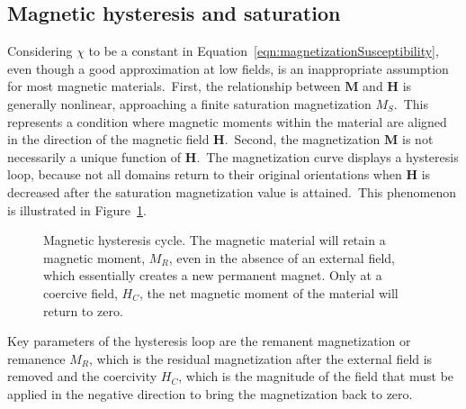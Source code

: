 \subsection{Magnetic hysteresis and saturation}\label{subsec:hysteresisAndSaturation}
Considering $\chi$ to be a constant in Equation~\ref{eqn:magnetizationSusceptibility}, even though a good approximation at low fields, is an inappropriate assumption for most magnetic materials.\ First, the relationship between $\mathbf{M}$ and $\mathbf{H}$ is generally nonlinear, approaching a finite saturation magnetization $M_{S}$.\ This represents a condition where magnetic moments within the material are aligned in the direction of the magnetic field $\mathbf{H}$.\ Second, the magnetization $\mathbf{M}$ is not necessarily a unique function of $\mathbf{H}$.\ The magnetization curve displays a hysteresis loop, because not all domains return to their original orientations when $\mathbf{H}$ is decreased after the saturation magnetization value is attained.\ This phenomenon is illustrated in Figure~\ref{fig:magneticHysteresis}.\
\begin{figure}[htb]
\centering
\caption[Magnetic hysteresis cycle]{Magnetic hysteresis cycle. The magnetic material will retain a magnetic moment, $M_{R}$, even in the absence of an external field, which essentially creates a new permanent magnet. Only at a coercive field, $H_{C}$, the net magnetic moment of the material will return to zero.}%
\label{fig:magneticHysteresis}
\end{figure}
Key parameters of the hysteresis loop are the remanent magnetization or remanence $M_{R}$, which is the residual magnetization after the external field is removed and the coercivity $H_{C}$, which is the magnitude of the field that must be applied in the negative direction to bring the magnetization back to zero.\
%
